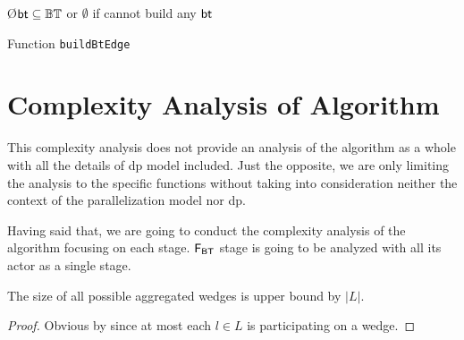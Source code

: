 \begin{algorithm}
\SetAlgoRefName{[A10]}
\O{$\mathsf{bt} \subseteq \mathbb{BT}$ or $\emptyset$ if cannot build any $\mathsf{bt}$}
\caption{Function \texttt{buildBtEdge}}
\label{algo:buildBtEdge}
\end{algorithm}

\clearpage
\section{Complexity Analysis of Algorithm}
This complexity analysis does not provide an analysis of the algorithm as a whole with all the details of \acrshort{dp} model included.
Just the opposite, we are only limiting the analysis to the specific functions without taking into consideration neither the context of the parallelization model nor \acrshort{dp}.

Having said that, we are going to conduct the complexity analysis of the algorithm focusing on each stage. 
$\mathsf{F_{BT}}$ stage is going to be analyzed with all its actor as a single stage.

\begin{theorem}[$|\aw| \leq |L|$]\label{theorem:awg}
The size of all possible aggregated wedges is upper bound by $|L|$.
\end{theorem}
\begin{proof}
Obvious by  since at most each $l \in L$ is participating on a wedge.
\end{proof}

